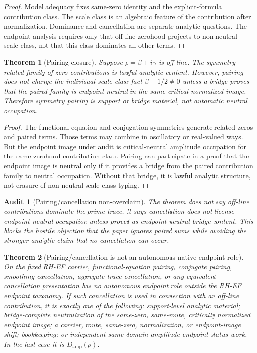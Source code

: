 \documentclass[11pt]{article}
\newtheorem{theorem}{Theorem}[section]
\newtheorem{audit}{Audit}[section]
\newcommand{\Damp}{D_{\mathrm{amp}}}
\begin{document}
\begin{proof}
Model adequacy fixes same-zero identity and the explicit-formula contribution class.  The scale class is an algebraic feature of the contribution after normalization.  Dominance and cancellation are separate analytic questions.  The endpoint analysis requires only that off-line zerohood projects to non-neutral scale class, not that this class dominates all other terms.
\end{proof}

\begin{theorem}[Pairing closure]
Suppose \(\rho=\beta+i\gamma\) is off line.  The symmetry-related family of zero contributions is lawful analytic content.  However, pairing does not change the individual scale-class fact \(\beta-1/2\ne 0\) unless a bridge proves that the paired family is endpoint-neutral in the same critical-normalized image.  Therefore symmetry pairing is support or bridge material, not automatic neutral occupation.
\end{theorem}

\begin{proof}
The functional equation and conjugation symmetries generate related zeros and paired terms.  Those terms may combine in oscillatory or real-valued ways.  But the endpoint image under audit is critical-neutral amplitude occupation for the same zerohood contribution class.  Pairing can participate in a proof that the endpoint image is neutral only if it provides a bridge from the paired contribution family to neutral occupation.  Without that bridge, it is lawful analytic structure, not erasure of non-neutral scale-class typing.
\end{proof}

\begin{audit}[Pairing/cancellation non-overclaim]
The theorem does not say off-line contributions dominate the prime trace.  It says cancellation does not license endpoint-neutral occupation unless proved as endpoint-neutral bridge content.  This blocks the hostile objection that the paper ignores paired sums while avoiding the stronger analytic claim that no cancellation can occur.
\end{audit}


\begin{theorem}[Pairing/cancellation is not an autonomous native endpoint role]\label{thm:pairing-cancellation-not-autonomous-role}
On the fixed RH-EF carrier, functional-equation pairing, conjugate pairing, smoothing cancellation, aggregate trace cancellation, or any equivalent cancellation presentation has no autonomous endpoint role outside the RH-EF endpoint taxonomy.  If such cancellation is used in connection with an off-line contribution, it is exactly one of the following: support-level analytic material; bridge-complete neutralization of the same-zero, same-route, critically normalized endpoint image; a carrier, route, same-zero, normalization, or endpoint-image shift; bookkeeping; or independent same-domain amplitude endpoint-status work.  In the last case it is \(\Damp(\rho)\).
\end{theorem}
\end{document}
